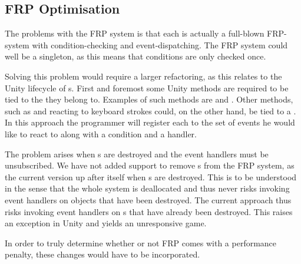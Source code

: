 \subsection{FRP Optimisation}
The problems with the \gls{FRP} system is that each  is actually a full-blown \gls{FRP}-system with condition-checking and event-dispatching. The \gls{FRP} system could well be a singleton, as this means that conditions are only checked once.

Solving this problem would require a larger refactoring, as this relates to the Unity lifecycle of s. First and foremost some Unity methods are required to be tied to the  they belong to. Examples of such methods are  and . Other methods, such as  and reacting to keyboard strokes could, on the other hand, be tied to a . In this approach the programmer will register each  to the set of events he would like to react to along with a condition and a handler.

The problem arises when s are destroyed and the event handlers must be unsubscribed. We have not added support to remove s from the \gls{FRP} system, as the current version  up after itself when s are destroyed. This is to be understood in the sense that the whole system is deallocated and thus never risks invoking event handlers on objects that have been destroyed. The current approach thus risks invoking event handlers on s that have already been destroyed. This raises an exception in Unity and yields an unresponsive game.

In order to truly determine whether or not \gls{FRP} comes with a performance penalty, these changes would have to be incorporated.